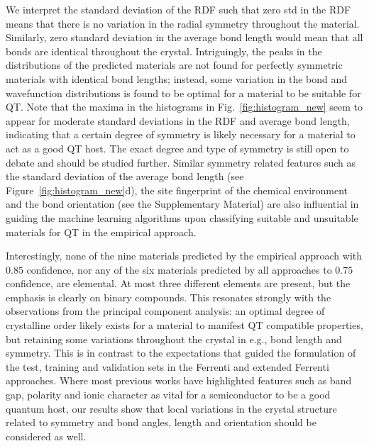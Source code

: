 \documentclass[superscriptaddress,unsortedaddress,
 amsmath,amssymb,
 aps,
]{revtex4-2}
\begin{document}
We interpret the standard deviation  of the RDF such that zero std in the RDF means that there is no variation in the radial symmetry throughout the material. Similarly, zero standard deviation in the average bond length would mean that all bonds are identical throughout the crystal. Intriguingly, the peaks in the distributions of the predicted materials are not found for perfectly symmetric materials with identical bond lengths; instead, some variation in the bond and wavefunction distributions is found to be optimal for a material to be suitable for QT.  
Note that the maxima  in the histograms in Fig.~\ref{fig:histogram_new} seem to appear for moderate standard deviations in the RDF and average bond length, indicating that a certain degree of symmetry is likely necessary for a material to act as a good QT host. The exact degree and type of symmetry is still open to debate and should be studied further. 
Similar symmetry related features such as the standard deviation of the average bond length (see Figure~\ref{fig:histogram_new}d), the site fingerprint of the chemical environment and the bond orientation (see the Supplementary Material) are also influential in guiding the machine learning algorithms upon classifying suitable and unsuitable materials for QT in the empirical approach. 


Interestingly, none of the nine materials predicted by the empirical approach with $0.85$ confidence, nor any of the six materials predicted by all approaches to $0.75$ confidence, are elemental. At most three different elements are present, but the emphasis is clearly on binary compounds. This resonates strongly with the observations from the principal component analysis: an optimal degree of crystalline order likely exists for a material to manifest QT compatible properties, but retaining some variations throughout the crystal in e.g., bond length and symmetry.  This is  in  
contrast to the expectations that guided the formulation of the test, training and validation sets in the Ferrenti and extended Ferrenti approaches. Where most previous works have highlighted features such as band gap, polarity and ionic character as vital for a semiconductor to be a good quantum host, our results show that local variations in the crystal structure related to symmetry and bond angles, length and orientation should be considered as well. 


\end{document}
